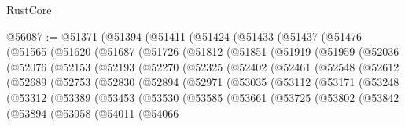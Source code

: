 \begin{lexlean}{RustCore}
\begin{coremodule}
@56087 := @51371
    (@51394
      (@51411
        (@51424
          (@51433
            (@51437
              (@51476
                (@51565
                  (@51620
                    (@51687
                      (@51726
                        (@51812
                          (@51851
                            (@51919
                              (@51959
                                (@52036
                                  (@52076
                                    (@52153
                                      (@52193
                                        (@52270
                                          (@52325
                                            (@52402
                                              (@52461
                                                (@52548
                                                  (@52612
                                                    (@52689
                                                      (@52753
                                                        (@52830
                                                          (@52894
                                                            (@52971
                                                              (@53035
                                                                (@53112
                                                                  (@53171
                                                                    (@53248
                                                                      (@53312
                                                                        (@53389
                                                                          (@53453
                                                                            (@53530
                                                                              (@53585
                                                                                (@53661
                                                                                  (@53725
                                                                                    (@53802
                                                                                      (@53842
                                                                                        (@53894
                                                                                          (@53958
                                                                                            (@54011
                                                                                              (@54066

\end{coremodule}
\end{lexlean}
